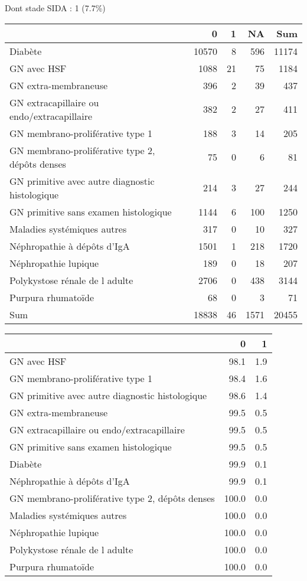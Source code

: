 \documentclass[11pt,a4paper]{article}\usepackage[]{graphicx}\usepackage[]{color}
\begin{document}
Dont stade SIDA : 1 (7.7\%)
\begin{table}[H]
\centering
\begin{tabular}{lrrrr}
  \hline
 & 0 & 1 & NA & Sum \\ 
  \hline
Diabète & 10570 & 8 & 596 & 11174 \\ 
  GN avec HSF & 1088 & 21 & 75 & 1184 \\ 
  GN extra-membraneuse & 396 & 2 & 39 & 437 \\ 
  GN extracapillaire ou endo/extracapillaire & 382 & 2 & 27 & 411 \\ 
  GN membrano-proliférative type 1 & 188 & 3 & 14 & 205 \\ 
  GN membrano-proliférative type 2, dépôts denses & 75 & 0 & 6 & 81 \\ 
  GN primitive avec autre diagnostic histologique & 214 & 3 & 27 & 244 \\ 
  GN primitive sans examen histologique & 1144 & 6 & 100 & 1250 \\ 
  Maladies systémiques autres & 317 & 0 & 10 & 327 \\ 
  Néphropathie à dépôts d'IgA & 1501 & 1 & 218 & 1720 \\ 
  Néphropathie lupique & 189 & 0 & 18 & 207 \\ 
  Polykystose rénale de l adulte & 2706 & 0 & 438 & 3144 \\ 
  Purpura rhumatoïde & 68 & 0 & 3 & 71 \\ 
  Sum & 18838 & 46 & 1571 & 20455 \\ 
   \hline
\end{tabular}
\end{table}
\begin{table}[H]
\centering
\begin{tabular}{lrr}
  \hline
 & 0 & 1 \\ 
  \hline
GN avec HSF & 98.1 & 1.9 \\ 
  GN membrano-proliférative type 1 & 98.4 & 1.6 \\ 
  GN primitive avec autre diagnostic histologique & 98.6 & 1.4 \\ 
  GN extra-membraneuse & 99.5 & 0.5 \\ 
  GN extracapillaire ou endo/extracapillaire & 99.5 & 0.5 \\ 
  GN primitive sans examen histologique & 99.5 & 0.5 \\ 
  Diabète & 99.9 & 0.1 \\ 
  Néphropathie à dépôts d'IgA & 99.9 & 0.1 \\ 
  GN membrano-proliférative type 2, dépôts denses & 100.0 & 0.0 \\ 
  Maladies systémiques autres & 100.0 & 0.0 \\ 
  Néphropathie lupique & 100.0 & 0.0 \\ 
  Polykystose rénale de l adulte & 100.0 & 0.0 \\ 
  Purpura rhumatoïde & 100.0 & 0.0 \\ 
   \hline
\end{tabular}
\end{table}
\end{document}
